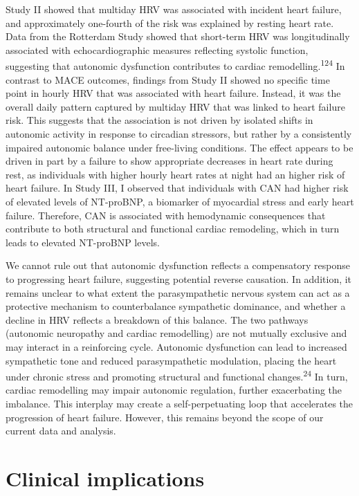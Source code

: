 \documentclass[
  letterpaper,
  headsepline=true,
  open=any]{scrbook}
\begin{document}
Study II showed that multiday HRV was associated with incident heart
failure, and approximately one-fourth of the risk was explained by
resting heart rate. Data from the Rotterdam Study showed that short-term
HRV was longitudinally associated with echocardiographic measures
reflecting systolic function, suggesting that autonomic dysfunction
contributes to cardiac remodelling.\textsuperscript{124} In contrast to
MACE outcomes, findings from Study II showed no specific time point in
hourly HRV that was associated with heart failure. Instead, it was the
overall daily pattern captured by multiday HRV that was linked to heart
failure risk. This suggests that the association is not driven by
isolated shifts in autonomic activity in response to circadian
stressors, but rather by a consistently impaired autonomic balance under
free-living conditions. The effect appears to be driven in part by a
failure to show appropriate decreases in heart rate during rest, as
individuals with higher hourly heart rates at night had an higher risk
of heart failure. In Study III, I observed that individuals with CAN had
higher risk of elevated levels of NT-proBNP, a biomarker of myocardial
stress and early heart failure. Therefore, CAN is associated with
hemodynamic consequences that contribute to both structural and
functional cardiac remodeling, which in turn leads to elevated NT-proBNP
levels.

We cannot rule out that autonomic dysfunction reflects a compensatory
response to progressing heart failure, suggesting potential reverse
causation. In addition, it remains unclear to what extent the
parasympathetic nervous system can act as a protective mechanism to
counterbalance sympathetic dominance, and whether a decline in HRV
reflects a breakdown of this balance. The two pathways (autonomic
neuropathy and cardiac remodelling) are not mutually exclusive and may
interact in a reinforcing cycle. Autonomic dysfunction can lead to
increased sympathetic tone and reduced parasympathetic modulation,
placing the heart under chronic stress and promoting structural and
functional changes.\textsuperscript{24} In turn, cardiac remodelling may
impair autonomic regulation, further exacerbating the imbalance. This
interplay may create a self-perpetuating loop that accelerates the
progression of heart failure. However, this remains beyond the scope of
our current data and analysis.

\hypertarget{clinical-implications}{%
\section{Clinical implications}\label{clinical-implications}}
\end{document}
